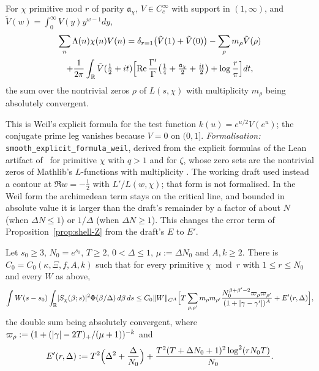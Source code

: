 \begin{lemma}\label{lem:shell-5b}
For $\chi$ primitive mod $r$ of parity $\mathfrak a_\chi$, $V\in C_c^\infty$ with support in $(1,\infty)$, and $\tilde V(w)=\int_0^\infty V(y)y^{w-1}dy$,
\begin{multline*}
\sum_n\Lambda(n)\chi(n)V(n)=\delta_{r=1}\bigl(\tilde V(1)+\tilde V(0)\bigr)-\sum_\rho m_\rho\tilde V(\rho)\\
+\frac1{2\pi}\int_{\mathbb R}\tilde V(\tfrac12+it)\Bigl[\operatorname{Re}\frac{\Gamma'}{\Gamma}\bigl(\tfrac14+\tfrac{\mathfrak a_\chi}2+\tfrac{it}2\bigr)+\log\frac r\pi\Bigr]dt,
\end{multline*}
the sum over the nontrivial zeros $\rho$ of $L(s,\chi)$ with multiplicity $m_\rho$ being absolutely convergent.
\end{lemma}
This is Weil's explicit formula for the test function $k(u)=e^{u/2}V(e^u)$; the conjugate prime leg vanishes because
$V=0$ on $(0,1]$. \emph{Formalisation:} \texttt{smooth\_explicit\_formula\_weil}, derived from the explicit formulas of the Lean artifact of~\cite{AF}
for primitive $\chi$ with $q>1$ and for $\zeta$, whose zero sets are the nontrivial zeros of Mathlib's $L$-functions with multiplicity
\tagL. The working draft used instead a contour at $\Re w=-\frac12$ with $L'/L(w,\chi)$; that form is not formalised. In the Weil form the archimedean
term stays on the critical line, and bounded in absolute value it is larger than the draft's remainder by a factor of about $N$ (when $\Delta N\le1$) or
$1/\Delta$ (when $\Delta N\ge1$). This changes the error term of Proposition~\ref{prop:shell-Z} from the draft's $E$ to $E'$.

\begin{proposition}\label{prop:shell-Z}
Let $s_0\ge3$, $N_0=e^{s_0}$, $T\ge2$, $0<\Delta\le1$, $\mu:=\Delta N_0$ and $A,k\ge2$. There is $C_0=C_0(\kappa,\Xi,f,A,k)$ such that for every primitive
$\chi\bmod r$ with $1\le r\le N_0$ and every $W$ as above,
\[
\int W(s-s_0)\int_{\mathbb R}\lvert S_\chi(\beta;s)\rvert^2\Phi(\beta/\Delta)\,d\beta\,ds\le C_0\lVert W\rVert_{C^A}\Bigl[T\sum_{\rho,\rho'}m_\rho m_{\rho'}
\frac{N_0^{\beta+\beta'-2}\varpi_\rho\varpi_{\rho'}}{(1+\lvert \gamma-\gamma'\rvert)^A}+E'(r,\Delta)\Bigr],
\]
the double sum being absolutely convergent, where $\varpi_\rho:=(1+(\lvert \gamma\rvert-2T)_+/(\mu+1))^{-k}$ and
\[
E'(r,\Delta):=T^2\Bigl(\Delta^2+\frac\Delta{N_0}\Bigr)+\frac{T^2(T+\Delta N_0+1)^2\log^2(rN_0T)}{N_0}.
\]
\end{proposition}

